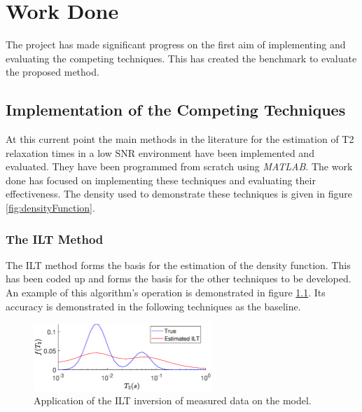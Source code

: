 \chapter{Work Done}\label{C:prog}
The project has made significant progress on the first aim of implementing and evaluating the competing techniques. This has created the benchmark to evaluate the proposed method.
\section{Implementation of the Competing Techniques}
At this current point the main methods in the literature for the estimation of T2 relaxation times in a low SNR environment have been implemented and evaluated. They have been programmed from scratch using \textit{MATLAB}. The work done has focused on implementing these techniques and evaluating their effectiveness. The density used to demonstrate these techniques is given in figure \ref{fig:densityFunction}.


\subsection{The ILT Method}
The ILT method forms the basis for the estimation of the density function. This has been coded up and forms the basis for the other techniques to be developed. An example of this algorithm's operation is demonstrated in figure \ref{fig:2002ILTSimulation}. Its accuracy is demonstrated in the following techniques as the baseline.

 \begin{figure}[ht!]
    \centering
    \includegraphics[width=0.6\textwidth]{backgroundVector/iltOptimise.eps}
    \caption{Application of the ILT inversion of measured data on the model.}
    \label{fig:2002ILTSimulation}
\end{figure}


